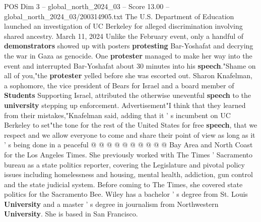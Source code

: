 \begin{textsample}{POS Dim 3 – global\_north\_2024\_03 – Score 13.00 – global\_north\_2024\_03/200314905.txt}
The U.S.
Department of Education launched an investigation of UC Berkeley for alleged discrimination involving shared ancestry.
March 11, 2024 Unlike the February event, only a handful of \textbf{demonstrators} showed up with posters \textbf{protesting} Bar-Yoshafat and decrying the war in Gaza as genocide.
One \textbf{protester} managed to make her way into the event and interrupted Bar-Yoshafat about 30 minutes into his \textbf{speech}."Shame on all of you,"the \textbf{protester} yelled before she was escorted out.
Sharon Knafelman, a sophomore, the vice president of Bears for Israel and a board member of \textbf{Students} Supporting Israel, attributed the otherwise uneventful \textbf{speech} to the \textbf{university} stepping up enforcement.
Advertisement"I think that they learned from their mistakes,"Knafelman said, adding that it ' s incumbent on UC Berkeley to set"the tone for the rest of the United States for free \textbf{speech}, that we respect and we allow everyone to come and share their point of view as long as it ' s being done in a peaceful @ @ @ @ @ @ @ @ @ @ Bay Area and North Coast for the Los Angeles Times.
She previously worked with The Times ' Sacramento bureau as a state politics reporter, covering the Legislature and pivotal policy issues including homelessness and housing, mental health, addiction, gun control and the state judicial system.
Before coming to The Times, she covered state politics for the Sacramento Bee.
Wiley has a bachelor ' s degree from St.
Louis \textbf{University} and a master ' s degree in journalism from Northwestern \textbf{University}.
She is based in San Francisco.

\end{textsample}
